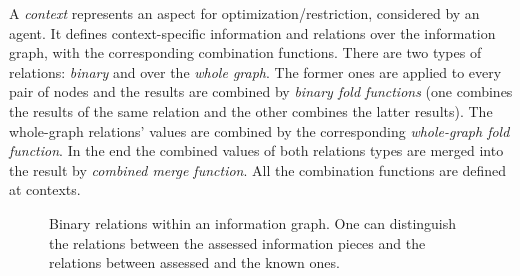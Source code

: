 \medskip

\noindent
A \emph{context} represents an aspect for optimization/restriction, considered
by an agent. It defines context-specific information and relations over the
information graph, with the corresponding combination functions. There are
two types of relations: \emph{binary} and over the \emph{whole graph}. The former ones
are applied to every pair of nodes and the results are combined by
\emph{binary fold functions} (one combines the results of the same relation
and the other combines the latter results). The whole-graph relations' values are
combined by the corresponding \emph{whole-graph fold function}. In the end the
combined values of both relations types are merged into the result by
\emph{combined merge function}. All the combination functions are defined at
contexts.

\begin{figure}[h]
  \centering
  \fbox{  }
  \caption{Binary relations within an information graph. One can
           distinguish the relations between the assessed information pieces
           and the relations between assessed and the known ones.
          }
\end{figure}




%
